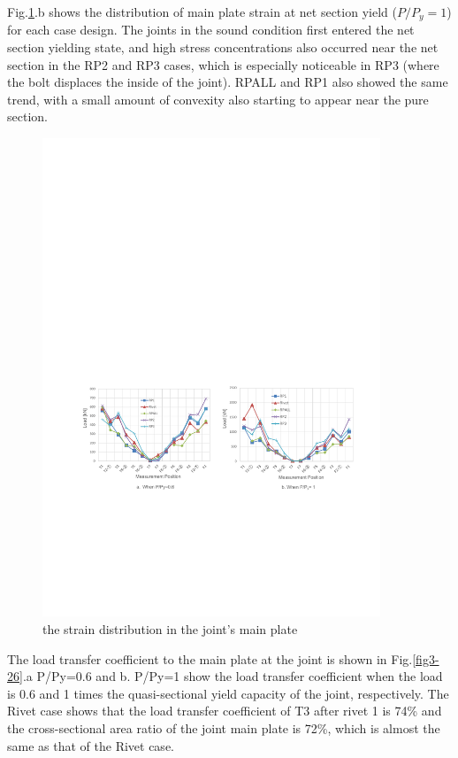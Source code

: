 Fig.\ref{fig3-24}.b shows the distribution of main plate strain at net section yield ($P/P_y=1$) for each case design. The joints in the sound condition first entered the net section yielding state, and high stress concentrations also occurred near the net section in the RP2 and RP3 cases, which is especially noticeable in RP3 (where the bolt displaces the inside of the joint). RPALL and RP1 also showed the same trend, with a small amount of convexity also starting to appear near the pure section.



\begin{figure}[htbp]
    \centering
    \includegraphics[width=0.9\textwidth]{imgs/ch3/fig3-24.pdf}
    \caption{the strain distribution in the joint's main plate}
    \label{fig3-24}
\end{figure}


The load transfer coefficient to the main plate at the joint is shown in Fig.\ref{fig3-26}.a P/Py=0.6 and b. P/Py=1 show the load transfer coefficient when the load is 0.6 and 1 times the quasi-sectional yield capacity of the joint, respectively. The Rivet case shows that the load transfer coefficient of T3 after rivet 1 is 74\% and the cross-sectional area ratio of the joint main plate is 72\%, which is almost the same as that of the Rivet case.

